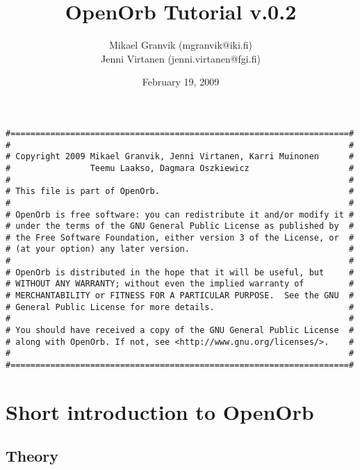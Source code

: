 \documentclass[12pt,english,twoside,a4paper]{report}
\title{OpenOrb Tutorial v.0.2}
\author{Mikael Granvik (mgranvik@iki.fi) \\ Jenni Virtanen (jenni.virtanen@fgi.fi)}
\date{February 19, 2009}
\begin{document}
\maketitle
{}

\setcounter{page}{1}

\begin{verbatim}
#====================================================================#
#                                                                    #
# Copyright 2009 Mikael Granvik, Jenni Virtanen, Karri Muinonen      #
#                Teemu Laakso, Dagmara Oszkiewicz                    #
#                                                                    #
# This file is part of OpenOrb.                                      #
#                                                                    #
# OpenOrb is free software: you can redistribute it and/or modify it #
# under the terms of the GNU General Public License as published by  #
# the Free Software Foundation, either version 3 of the License, or  #
# (at your option) any later version.                                #
#                                                                    #
# OpenOrb is distributed in the hope that it will be useful, but     #
# WITHOUT ANY WARRANTY; without even the implied warranty of         #
# MERCHANTABILITY or FITNESS FOR A PARTICULAR PURPOSE.  See the GNU  #
# General Public License for more details.                           #
#                                                                    #
# You should have received a copy of the GNU General Public License  #
# along with OpenOrb. If not, see <http://www.gnu.org/licenses/>.    #
#                                                                    #
#====================================================================#
\end{verbatim}

\pagebreak

\tableofcontents

\pagebreak
{}
\setcounter{page}{1}

\chapter{Short introduction to OpenOrb}

\section{Theory}
\end{document}
